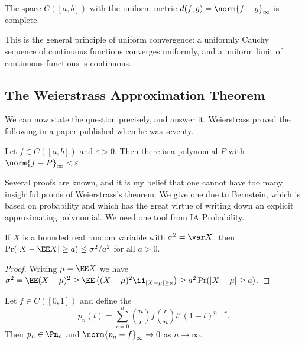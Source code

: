 \begin{theorem}\label{thm:cab-complete}
	The space $C([a,b])$ with the uniform metric $d(f,g) = \norm{f-g}_\infty$ is complete.
\end{theorem}

This is the general principle of uniform convergence: a uniformly Cauchy sequence of continuous functions converges uniformly, and a uniform limit of continuous functions is continuous.

\subsection{The Weierstrass Approximation Theorem}

We can now state the question precisely, and answer it. Weierstrass proved the following in a paper published when he was seventy.

\begin{theorem}\label{tia-thm:weierstrass}
	Let $f \in C([a,b])$ and $\varepsilon>0$. Then there is a polynomial $P$ with $\norm{f-P}_\infty<\varepsilon$.
\end{theorem}

Several proofs are known, and it is my belief that one cannot have too many insightful proofs of Weierstrass's theorem. We give one due to Bernstein, which is based on probability and which has the great virtue of writing down an explicit approximating polynomial. We need one tool from IA Probability.

\begin{theorem}\label{thm:chebyshev-ineq}
	If $X$ is a bounded real random variable with $\sigma^2 = \var X$, then $\Pr(|X-\EE X|\geq a) \leq \sigma^2/a^2$ for all $a>0$.
\end{theorem}

\begin{proof}
	Writing $\mu = \EE X$ we have $\sigma^2 = \EE(X-\mu)^2 \geq \EE\left((X-\mu)^2\ii_{|X-\mu|\geq a}\right) \geq a^2\Pr(|X-\mu|\geq a)$.
\end{proof}

\begin{theorem}[Bernstein]\label{thm:bernstein}
	Let $f\in C([0,1])$ and define the 
	$$p_n(t) = \sum_{r=0}^n\binom{n}{r}f\!\left(\frac{r}{n}\right)t^r(1-t)^{n-r}.$$
	Then $p_n \in \Pn_n$ and $\norm{p_n - f}_\infty\to 0$ as $n \to\infty$.
\end{theorem}

